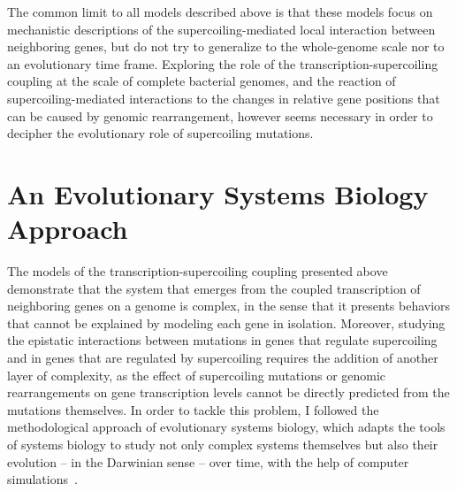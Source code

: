 The common limit to all models described above is that these models focus on mechanistic descriptions of the supercoiling-mediated local interaction between neighboring genes, but do not try to generalize to the whole-genome scale nor to an evolutionary time frame.
Exploring the role of the transcription-supercoiling coupling at the scale of complete bacterial genomes, and the reaction of supercoiling-mediated interactions to the changes in relative gene positions that can be caused by genomic rearrangement, however seems necessary in order to decipher the evolutionary role of supercoiling mutations.


\section{An Evolutionary Systems Biology Approach}

The models of the transcription-supercoiling coupling presented above demonstrate that the system that emerges from the coupled transcription of neighboring genes on a genome is complex, in the sense that it presents behaviors that cannot be explained by modeling each gene in isolation.
Moreover, studying the epistatic interactions between mutations in genes that regulate supercoiling and in genes that are regulated by supercoiling requires the addition of another layer of complexity, as the effect of supercoiling mutations or genomic rearrangements on gene transcription levels cannot be directly predicted from the mutations themselves.
In order to tackle this problem, I followed the methodological approach of evolutionary systems biology, which adapts the tools of systems biology to study not only complex systems themselves but also their evolution -- in the Darwinian sense -- over time, with the help of computer simulations~\citep{beslon2021}.

